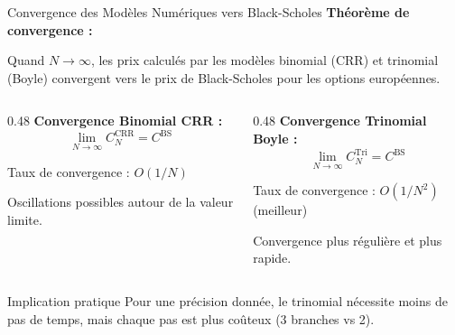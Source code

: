 \documentclass[aspectratio=169, 10pt]{beamer}
\begin{document}
\begin{frame}{Convergence des Modèles Numériques vers Black-Scholes}
    \textbf{Théorème de convergence :}
    
    Quand $N \to \infty$, les prix calculés par les modèles binomial (CRR) et trinomial (Boyle) convergent vers le prix de Black-Scholes pour les options européennes.
    
    \vspace{0.3cm}
    \begin{columns}[T]
        \begin{column}{0.48\textwidth}
            \textbf{Convergence Binomial CRR :}
            $$\lim_{N \to \infty} C_N^{\text{CRR}} = C^{\text{BS}}$$
            
            \vspace{0.2cm}
            Taux de convergence : $O(1/N)$
            
            \vspace{0.2cm}
            Oscillations possibles autour de la valeur limite.
        \end{column}
        \begin{column}{0.48\textwidth}
            \textbf{Convergence Trinomial Boyle :}
            $$\lim_{N \to \infty} C_N^{\text{Tri}} = C^{\text{BS}}$$
            
            \vspace{0.2cm}
            Taux de convergence : $O(1/N^2)$ (meilleur)
            
            \vspace{0.2cm}
            Convergence plus régulière et plus rapide.
        \end{column}
    \end{columns}
    
    \vspace{0.3cm}
    \begin{block}{Implication pratique}
    Pour une précision donnée, le trinomial nécessite moins de pas de temps, mais chaque pas est plus coûteux (3 branches vs 2).
    \end{block}
\end{frame}
\end{document}
